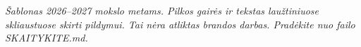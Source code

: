 \documentclass[12pt,a4paper]{article}
\begin{document}

\ifAnotacija\fi
\tableofcontents
\ifGaires
  \vfill
  \noindent\textit{Šablonas 2026--2027 mokslo metams. Pilkos gairės ir tekstas
  laužtiniuose skliaustuose skirti pildymui. Tai nėra atliktas brandos darbas.
  Pradėkite nuo failo SKAITYKITE.md.}
\fi
\ifTerminai\fi







\ifRekomendacijos\fi


\end{document}
